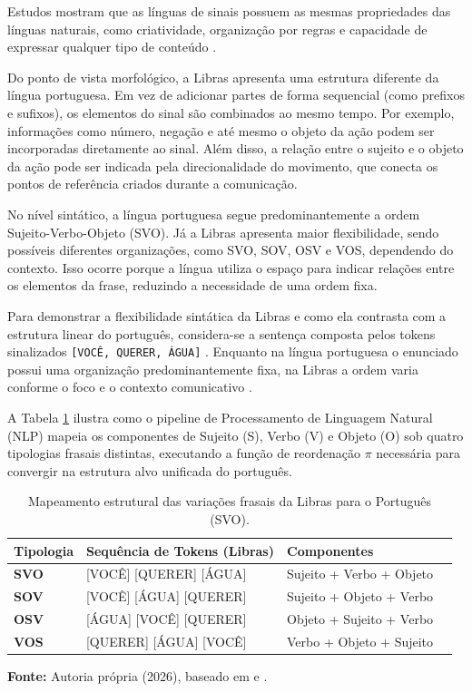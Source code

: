 \documentclass[
    12pt,                %
    openright,           %
    oneside,             %
    a4paper,             %
    english,             %
    brazil               %
]{abntex2}
\begin{document}
Estudos mostram que as línguas de sinais possuem as mesmas propriedades das línguas naturais, como criatividade, organização por regras e capacidade de expressar qualquer tipo de conteúdo \cite{Quadros2004}.

Do ponto de vista morfológico, a Libras apresenta uma estrutura diferente da língua portuguesa. Em vez de adicionar partes de forma sequencial (como prefixos e sufixos), os elementos do sinal são combinados ao mesmo tempo. Por exemplo, informações como número, negação e até mesmo o objeto da ação podem ser incorporadas diretamente ao sinal. Além disso, a relação entre o sujeito e o objeto da ação pode ser indicada pela direcionalidade do movimento, que conecta os pontos de referência criados durante a comunicação.

No nível sintático, a língua portuguesa segue predominantemente a ordem Sujeito-Verbo-Objeto (SVO). Já a Libras apresenta maior flexibilidade, sendo possíveis diferentes organizações, como SVO, SOV, OSV e VOS, dependendo do contexto. Isso ocorre porque a língua utiliza o espaço para indicar relações entre os elementos da frase, reduzindo a necessidade de uma ordem fixa.

Para demonstrar a flexibilidade sintática da Libras e como ela contrasta com a estrutura linear do português, considera-se a sentença composta pelos tokens sinalizados \texttt{[VOCÊ, QUERER, ÁGUA]} \cite{Lopez2017}. Enquanto na língua portuguesa o enunciado possui uma organização predominantemente fixa, na Libras a ordem varia conforme o foco e o contexto comunicativo \cite{Quadros2004}. 

A Tabela \ref{tab:variacoes_libras} ilustra como o pipeline de Processamento de Linguagem Natural (NLP) mapeia os componentes de Sujeito (S), Verbo (V) e Objeto (O) sob quatro tipologias frasais distintas, executando a função de reordenação $\pi$ necessária para convergir na estrutura alvo unificada do português.

\begin{table}[H]
\centering
\caption{Mapeamento estrutural das variações frasais da Libras para o Português (SVO).}
\label{tab:variacoes_libras}
\small
\begin{tabularx}{\textwidth}{lXll}
\hline
\textbf{Tipologia} & \textbf{Sequência de Tokens (Libras)} & \textbf{Componentes}  \\ \hline
\textbf{SVO}       & [VOCÊ] [QUERER] [ÁGUA]                & Sujeito + Verbo + Objeto           \\
\textbf{SOV}       & [VOCÊ] [ÁGUA] [QUERER]                & Sujeito + Objeto + Verbo            \\
\textbf{OSV}       & [ÁGUA] [VOCÊ] [QUERER]                & Objeto + Sujeito + Verbo           \\
\textbf{VOS}       & [QUERER] [ÁGUA] [VOCÊ]                & Verbo + Objeto + Sujeito            \\ \hline
\end{tabularx}
\noindent\footnotesize{\newline \textbf{Fonte:} Autoria própria (2026), baseado em  e .}
\end{table}
\end{document}
